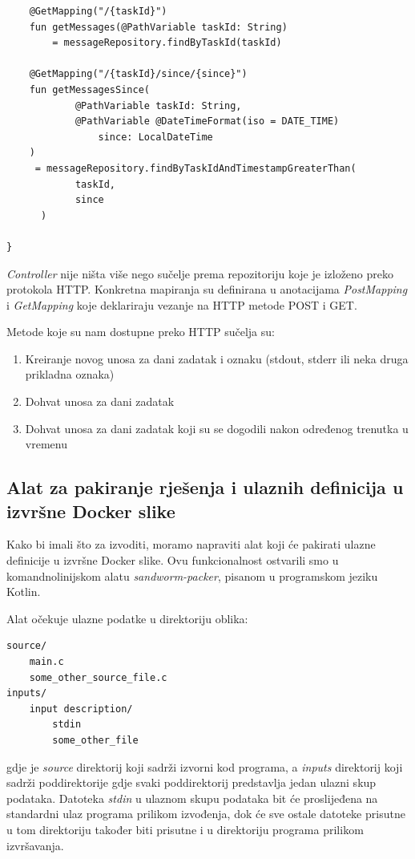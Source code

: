 \documentclass[times, utf8, zavrsni]{fer}
\begin{document}
{\begin{lstlisting}
    @GetMapping("/{taskId}")
    fun getMessages(@PathVariable taskId: String)
	 	= messageRepository.findByTaskId(taskId)

    @GetMapping("/{taskId}/since/{since}")
    fun getMessagesSince(
            @PathVariable taskId: String,
            @PathVariable @DateTimeFormat(iso = DATE_TIME)
				since: LocalDateTime
    )
     = messageRepository.findByTaskIdAndTimestampGreaterThan(
	  		taskId,
			since
	  )

}
\end{lstlisting}

{\textit{Controller}} nije ništa više nego sučelje prema repozitoriju koje je izloženo preko protokola HTTP. Konkretna mapiranja su definirana u anotacijama {\textit{PostMapping}} i {\textit{GetMapping}} koje deklariraju vezanje na HTTP metode POST i GET.

\hfill
\break

Metode koje su nam dostupne preko HTTP sučelja su:

\begin{enumerate}
\item Kreiranje novog unosa za dani zadatak i oznaku (stdout, stderr ili neka druga prikladna oznaka)
\item Dohvat unosa za dani zadatak
\item Dohvat unosa za dani zadatak koji su se dogodili nakon određenog trenutka u vremenu
\end{enumerate}

\subsection{Alat za pakiranje rješenja i ulaznih definicija u izvršne Docker slike}

Kako bi imali što za izvoditi, moramo napraviti alat koji će pakirati ulazne definicije u izvršne Docker slike. Ovu funkcionalnost ostvarili smo u komandnolinijskom alatu {\textit{sandworm-packer}}, pisanom u programskom jeziku Kotlin.

Alat očekuje ulazne podatke u direktoriju oblika:

\begin{lstlisting}
source/
    main.c
    some_other_source_file.c
inputs/
    input description/
        stdin
        some_other_file
\end{lstlisting}

gdje je {\textit{source}} direktorij koji sadrži izvorni kod programa, a {\textit{inputs}} direktorij koji sadrži poddirektorije gdje svaki poddirektorij predstavlja jedan ulazni skup podataka. Datoteka {\textit{stdin}} u ulaznom skupu podataka bit će proslijeđena na standardni ulaz programa prilikom izvođenja, dok će sve ostale datoteke prisutne u tom direktoriju također biti prisutne i u direktoriju programa prilikom izvršavanja.

}
\end{document}
